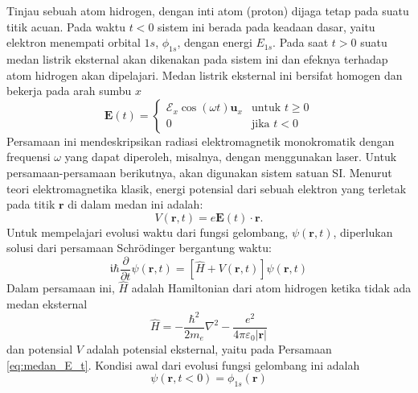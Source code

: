 \documentclass[a4paper,bahasa]{paper}
\renewcommand{\imath}{\mathfrak{i}}
\begin{document}
Tinjau sebuah atom hidrogen, dengan inti atom (proton) dijaga tetap pada suatu titik
acuan. Pada waktu $t < 0$ sistem ini berada pada keadaan dasar, yaitu elektron
menempati orbital $1s$, $\phi_{1s}$, dengan energi $E_{1s}$. Pada saat $t > 0$
suatu medan listrik eksternal akan dikenakan pada sistem ini dan efeknya
terhadap atom hidrogen akan dipelajari.
Medan listrik eksternal ini bersifat homogen dan bekerja pada arah sumbu $x$
%
\begin{equation}
\mathbf{E}(t) =
\begin{cases} 
\mathcal{E}_{x} \cos(\omega t) \mathbf{u}_{x} & \mbox{untuk } t \geq 0\\
0 & \mbox{jika } t < 0
\end{cases}
\label{eq:medan_E_t}
\end{equation}
%
Persamaan ini mendeskripsikan radiasi elektromagnetik monokromatik
dengan frequensi $\omega$ yang dapat diperoleh, misalnya, dengan menggunakan
laser. Untuk persamaan-persamaan berikutnya, akan digunakan sistem satuan SI.
Menurut teori elektromagnetika klasik, energi potensial dari sebuah elektron
yang terletak pada titik $\mathbf{r}$ di dalam medan ini adalah:
\begin{equation}
V(\mathbf{r},t) = e \mathbf{E}(t) \cdot \mathbf{r}.
\end{equation}
Untuk mempelajari evolusi waktu dari fungsi gelombang, $\psi(\mathbf{r},t)$,
diperlukan solusi dari persamaan Schr\"{o}dinger bergantung waktu:
%
\begin{equation}
\imath \hbar \frac{\partial}{\partial t} \psi(\mathbf{r},t) =
\left[ \hat{H} + V(\mathbf{r},t) \right] \psi(\mathbf{r},t)
\label{eq:td_sch}
\end{equation}
%
Dalam persamaan ini, $\hat{H}$ adalah Hamiltonian dari atom hidrogen
ketika tidak ada medan eksternal
%
\begin{equation}
\hat{H} = -\frac{\hbar^2}{2m_{e}}\nabla^2 -
\frac{e^2}{4\pi\varepsilon_{0}\left|\mathbf{r}\right|}
\end{equation}
%
dan potensial $V$ adalah potensial eksternal, yaitu pada Persamaan \eqref{eq:medan_E_t}.
Kondisi awal dari evolusi fungsi gelombang ini adalah
\begin{equation}
\psi(\mathbf{r}, t < 0) = \phi_{1s}(\mathbf{r})
\end{equation}
\end{document}
